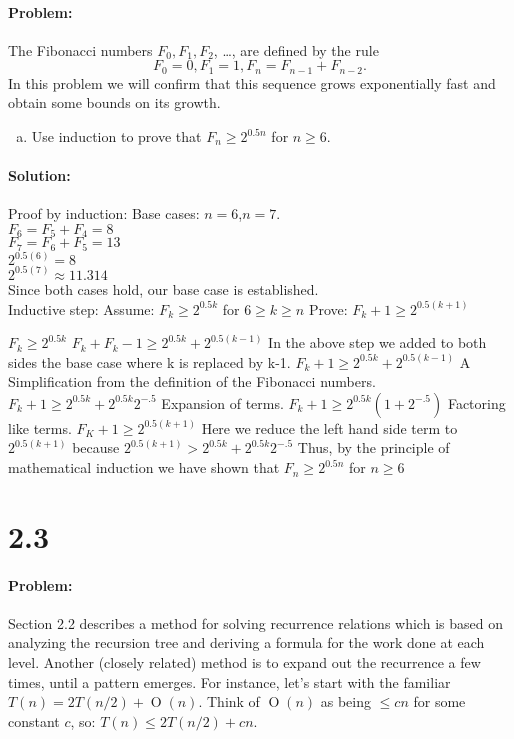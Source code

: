 \documentclass[12pt]{article}
\newcommand{\BigO}[1]{\ensuremath{\operatorname{O}\left(#1\right)}}
\begin{document}
\paragraph{Problem:}
The Fibonacci numbers $F_0, F_1, F_2$, \ldots, are defined by the rule
\[ F_0 = 0, F_1 = 1, F_n = F_{n - 1} + F_{n - 2}. \]
In this problem we will confirm that this sequence grows exponentially
fast and obtain some
bounds on its growth.

\begin{enumerate}[(a)]
\item Use induction to prove that $F_n \geq 2^{0.5n}$ for $n \geq 6$.
\end{enumerate}

\paragraph{Solution:}
Proof by induction:
Base cases: $n=6$,$n=7$. \\
    $F_6 = F_5 + F_4 = 8$ \\
    $F_7 = F_6 + F_5 = 13$ \\
    $2^{0.5(6)} = 8$ \\
    $2^{0.5(7)} \approx 11.314$ \\
    Since both cases hold, our base case is established. \\

Inductive step:
	Assume: $F_k \geq 2^{0.5k}$ for $6 \geq k \geq n$
	Prove: $F_k+1 \geq 2^{0.5(k+1)}$

	$F_k \geq 2^{0.5k}$
	$F_k + F_k-1 \geq 2^{0.5k} + 2^{0.5(k-1)}$
		In the above step we added to both sides the base case where k is replaced by k-1.
	$F_k+1 \geq 2^{0.5k} + 2^{0.5(k-1)}$
		A Simplification from the definition of the Fibonacci numbers.
	$F_k+1 \geq 2^{0.5k} + 2^{0.5k}2^{-.5}$
		Expansion of terms.
	$F_k+1 \geq 2^{0.5k}(1 + 2^{-.5})$
		Factoring like terms.
	$F_K+1 \geq 2^{0.5(k+1)}$
		Here we reduce the left hand side term to $2^{0.5(k+1)}$ because $2^{0.5(k+1)} > 2^{0.5k}+2^{0.5k}2^{-.5}$ 
	Thus, by the principle of mathematical induction we have shown that $F_n \geq 2^{0.5n}$ for $n \geq 6$ 
	
	
\section*{2.3}
\paragraph{Problem:}
Section 2.2 describes a method for solving recurrence relations which is
based on analyzing the recursion tree and deriving a formula for the
work done at each level.  Another (closely related) method is to expand
out the recurrence a few times, until a pattern emerges. For instance,
let’s start with the familiar $T(n) = 2T(n/2) + \BigO{n}$. Think of
$\BigO{n}$ as being $\leq cn$ for some constant $c$,
so: $T(n) \leq 2T(n/2) + cn$. 
\end{document}
